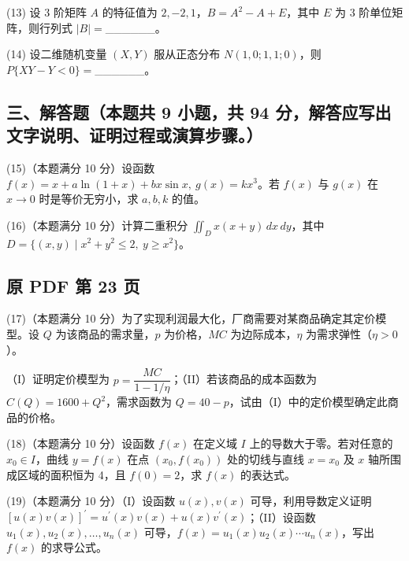 \documentclass[UTF8,12pt]{ctexart}
\begin{document}
(13) 设 3 阶矩阵 \(\displaystyle A\) 的特征值为 \(\displaystyle 2,\allowbreak -2,\allowbreak 1\)，\(\displaystyle B=A^2-A+E\)，其中 \(\displaystyle E\) 为 3 阶单位矩阵，则行列式 \(\displaystyle |B|=\)\_\_\_\_\_\_。


(14) 设二维随机变量 \(\displaystyle (X,\allowbreak Y)\) 服从正态分布 \(\displaystyle N(1,\allowbreak 0;1,\allowbreak 1;0)\)，则 \(\displaystyle P\{XY-Y<0\}=\)\_\_\_\_\_\_。


\subsection*{三、解答题（本题共 9 小题，共 94 分，解答应写出文字说明、证明过程或演算步骤。）}

(15)（本题满分 10 分）设函数 \(\displaystyle f(x)=x+a\ln(1+x)+bx\sin x,\allowbreak \ g(x)=kx^3\)。若 \(\displaystyle f(x)\) 与 \(\displaystyle g(x)\) 在 \(\displaystyle x\to0\) 时是等价无穷小，求 \(\displaystyle a,\allowbreak b,\allowbreak k\) 的值。


(16)（本题满分 10 分）计算二重积分 \(\displaystyle \iint_D x(x+y)\,dx\,dy\)，其中 \(\displaystyle D=\{(x,\allowbreak y)\mid x^2+y^2\leq2,\allowbreak \ y\geq x^2\}\)。


\clearpage

\subsection*{原 PDF 第 23 页}

(17)（本题满分 10 分）为了实现利润最大化，厂商需要对某商品确定其定价模型。设 \(\displaystyle Q\) 为该商品的需求量，\(\displaystyle p\) 为价格，\(\displaystyle MC\) 为边际成本，\(\displaystyle \eta\) 为需求弹性（\(\displaystyle \eta>0\)）。


（I）证明定价模型为 \(\displaystyle p=\dfrac{\displaystyle MC}{\displaystyle 1-1/\eta}\)；（II）若该商品的成本函数为 \(\displaystyle C(Q)=1600+Q^2\)，需求函数为 \(\displaystyle Q=40-p\)，试由（I）中的定价模型确定此商品的价格。


(18)（本题满分 10 分）设函数 \(\displaystyle f(x)\) 在定义域 \(\displaystyle I\) 上的导数大于零。若对任意的 \(\displaystyle x_0\in I\)，曲线 \(\displaystyle y=f(x)\) 在点 \(\displaystyle (x_0,\allowbreak f(x_0))\) 处的切线与直线 \(\displaystyle x=x_0\) 及 \(\displaystyle x\) 轴所围成区域的面积恒为 4，且 \(\displaystyle f(0)=2\)，求 \(\displaystyle f(x)\) 的表达式。


(19)（本题满分 10 分）（I）设函数 \(\displaystyle u(x),\allowbreak v(x)\) 可导，利用导数定义证明 \(\displaystyle [u(x)v(x)]^{\prime}=u^{\prime}(x)v(x)+u(x)v^{\prime}(x)\)；（II）设函数 \(\displaystyle u_1(x),\allowbreak u_2(x),\allowbreak \ldots,\allowbreak u_n(x)\) 可导，\(\displaystyle f(x)=u_1(x)u_2(x)\cdots u_n(x)\)，写出 \(\displaystyle f(x)\) 的求导公式。
\end{document}
